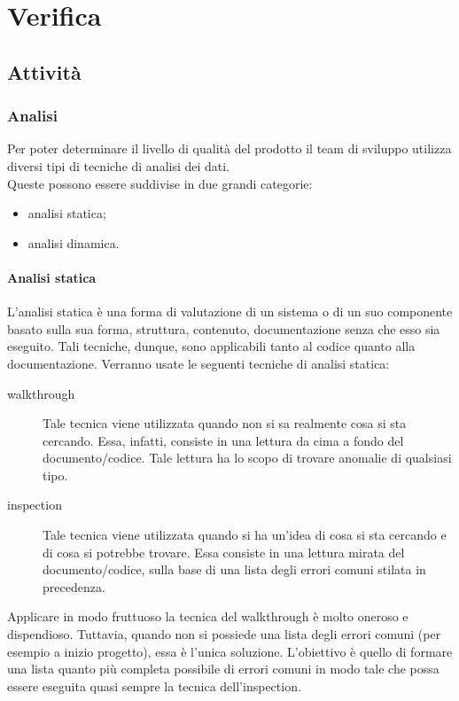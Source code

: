 \section{Verifica}
	\subsection{Attività}
		\subsubsection{Analisi}
			Per poter determinare il livello di qualità del prodotto il team di sviluppo utilizza diversi tipi di tecniche di analisi dei dati.\\
			Queste possono essere suddivise in due grandi categorie:
			\begin{itemize}
				\item analisi statica;
				\item analisi dinamica.
			\end{itemize}
			\paragraph{Analisi statica}
				L'analisi statica è una forma di valutazione di un sistema o di un suo componente basato sulla sua forma, struttura, contenuto, documentazione senza che esso sia eseguito. Tali tecniche, dunque, sono applicabili tanto al codice quanto alla documentazione.
				Verranno usate le seguenti tecniche di analisi statica:
				\begin{description}
					\item[walkthrough] Tale tecnica viene utilizzata quando non si sa realmente cosa si sta cercando. Essa, infatti, consiste in una lettura da cima a fondo del documento/codice. Tale lettura ha lo scopo di trovare anomalie di qualsiasi tipo.
					\item[inspection] Tale tecnica viene utilizzata quando si ha un'idea di cosa si sta cercando e di cosa si potrebbe trovare. Essa consiste in una lettura mirata del documento/codice, sulla base di una lista degli errori comuni stilata in precedenza.
				\end{description}
				Applicare in modo fruttuoso la tecnica del walkthrough è molto oneroso e dispendioso. Tuttavia, quando non si possiede una lista degli	errori comuni (per esempio a inizio progetto), essa è l'unica soluzione. L'obiettivo è quello di formare una lista quanto più completa possibile di errori comuni in modo tale che possa essere eseguita quasi sempre la tecnica dell'inspection.

